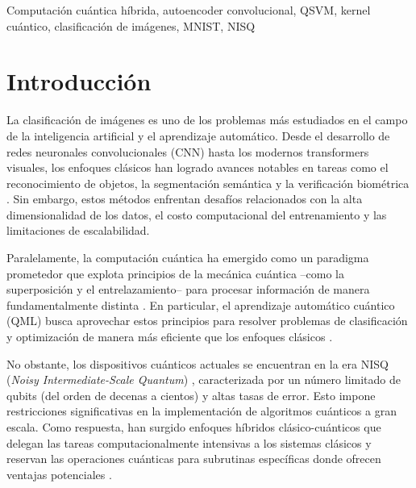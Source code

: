 \documentclass[conference]{IEEEtran}
\begin{document}
\begin{IEEEkeywords}
Computación cuántica híbrida, autoencoder convolucional, QSVM, kernel cuántico, 
clasificación de imágenes, MNIST, NISQ
\end{IEEEkeywords}

\section{Introducción}
\label{sec:introduccion}

La clasificación de imágenes es uno de los problemas más estudiados en el campo 
de la inteligencia artificial y el aprendizaje automático. Desde el desarrollo de 
redes neuronales convolucionales (CNN) hasta los modernos transformers visuales, 
los enfoques clásicos han logrado avances notables en tareas como el reconocimiento 
de objetos, la segmentación semántica y la verificación biométrica 
\cite{krizhevsky2012imagenet, he2016deep}. Sin embargo, estos métodos enfrentan 
desafíos relacionados con la alta dimensionalidad de los datos, el costo 
computacional del entrenamiento y las limitaciones de escalabilidad.

Paralelamente, la computación cuántica ha emergido como un paradigma prometedor 
que explota principios de la mecánica cuántica --como la superposición y el 
entrelazamiento-- para procesar información de manera fundamentalmente distinta 
\cite{nielsen2010quantum}. En particular, el aprendizaje automático cuántico 
(QML) busca aprovechar estos principios para resolver problemas de clasificación 
y optimización de manera más eficiente que los enfoques clásicos 
\cite{biamonte2017quantum, schuld2019machine}.

No obstante, los dispositivos cuánticos actuales se encuentran en la era NISQ 
(\textit{Noisy Intermediate-Scale Quantum}) \cite{preskill2018quantum}, 
caracterizada por un número limitado de qubits (del orden de decenas a cientos) 
y altas tasas de error. Esto impone restricciones significativas en la 
implementación de algoritmos cuánticos a gran escala. Como respuesta, han surgido 
enfoques híbridos clásico-cuánticos que delegan las tareas computacionalmente 
intensivas a los sistemas clásicos y reservan las operaciones cuánticas para 
subrutinas específicas donde ofrecen ventajas potenciales \cite{mcclean2016theory}.
\end{document}
